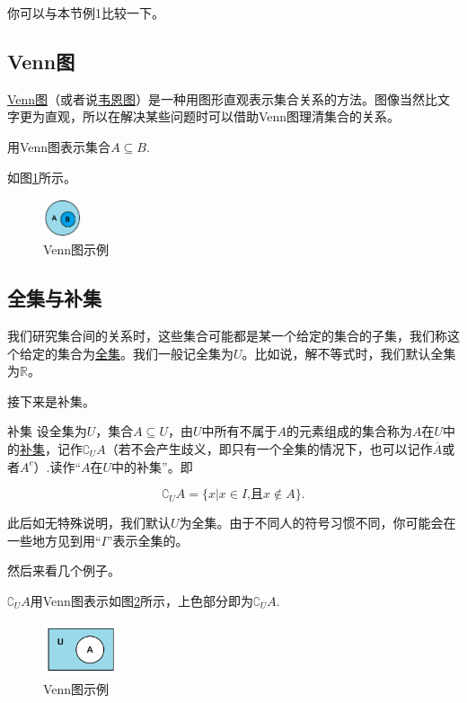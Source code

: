 \documentclass[lang=cn,math=cm,chinesefont=nofont,11pt,scheme=chinese,twocol]{elegantbook}
\begin{document}
\begin{remark}
  你可以与本节例1比较一下。
\end{remark}

\subsection{Venn图}
  \underline{Venn图}（或者说\underline{韦恩图}）是一种用图形直观表示集合关系的方法。图像当然比文字更为直观，所以在解决某些问题时可以借助Venn图理清集合的关系。

\begin{example}
  用Venn图表示集合$A\subseteq B$.
\end{example}
\begin{solution}
  如图\ref{img:Venn1}所示。
\end{solution}
\begin{figure}[h]
  \centering
  \includegraphics[width=0.1\textwidth]{image/Venn1.png}
  \caption{Venn图示例}
  \label{img:Venn1}
\end{figure}

\subsection{全集与补集}
  我们研究集合间的关系时，这些集合可能都是某一个给定的集合的子集，我们称这个给定的集合为\underline{全集}。我们一般记全集为$U$。比如说，解不等式时，我们默认全集为$\mathbb{R}$。

  接下来是补集。
\begin{definition}{补集}
  设全集为$U$，集合$A\subseteq U$，由$U$中所有不属于$A$的元素组成的集合称为$A$在$U$中的\underline{补集}，记作${\complement}_{U}A$（若不会产生歧义，即只有一个全集的情况下，也可以记作$\overline{A}$或者$A^c$）.读作“$A$在$U$中的补集”。即

  $${\complement}_{U}A=\{x|x\in I\text{,且}x\notin A\}.$$
\end{definition}
\begin{remark}
  此后如无特殊说明，我们默认$U$为全集。由于不同人的符号习惯不同，你可能会在一些地方见到用“$I$”表示全集的。
\end{remark}
  然后来看几个例子。
\begin{example}
  $\complement_{U}A$用Venn图表示如图\ref{img:Venn3}所示，上色部分即为$\complement_{U}A$.
\end{example}
\begin{figure}[h]
  \centering
  \includegraphics[width=0.2\textwidth]{image/Venn3.png}
  \caption{Venn图示例}
  \label{img:Venn3}
\end{figure}
\end{document}
